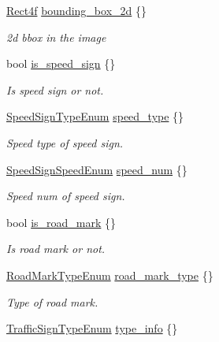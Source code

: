 \begin{DoxyCompactItemize}
\hyperlink{structmaf__perception__interface_1_1Rect4f}{Rect4f} \hyperlink{structmaf__perception__interface_1_1TrafficSign_abde6c105942de8ca3f7e6b130cdc5726}{bounding\+\_\+box\+\_\+2d} \{\}
\begin{DoxyCompactList}\small\item\em 2d bbox in the image \end{DoxyCompactList}\item 
bool \hyperlink{structmaf__perception__interface_1_1TrafficSign_a5db2969b358c4e9bac0cf510952f4c70}{is\+\_\+speed\+\_\+sign} \{\}
\begin{DoxyCompactList}\small\item\em Is speed sign or not. \end{DoxyCompactList}\item 
\hyperlink{structmaf__perception__interface_1_1SpeedSignTypeEnum}{Speed\+Sign\+Type\+Enum} \hyperlink{structmaf__perception__interface_1_1TrafficSign_a238b29fa9796c29dd7257bb6fbad4f3d}{speed\+\_\+type} \{\}
\begin{DoxyCompactList}\small\item\em Speed type of speed sign. \end{DoxyCompactList}\item 
\hyperlink{structmaf__perception__interface_1_1SpeedSignSpeedEnum}{Speed\+Sign\+Speed\+Enum} \hyperlink{structmaf__perception__interface_1_1TrafficSign_a75e468d996231eebfe68f4bae50cf7e7}{speed\+\_\+num} \{\}
\begin{DoxyCompactList}\small\item\em Speed num of speed sign. \end{DoxyCompactList}\item 
bool \hyperlink{structmaf__perception__interface_1_1TrafficSign_a0d3998525dd4c021906a0f0ed63998eb}{is\+\_\+road\+\_\+mark} \{\}
\begin{DoxyCompactList}\small\item\em Is road mark or not. \end{DoxyCompactList}\item 
\hyperlink{structmaf__perception__interface_1_1RoadMarkTypeEnum}{Road\+Mark\+Type\+Enum} \hyperlink{structmaf__perception__interface_1_1TrafficSign_aea4f9f1e5b1592aff7b76325463db754}{road\+\_\+mark\+\_\+type} \{\}
\begin{DoxyCompactList}\small\item\em Type of road mark. \end{DoxyCompactList}\item 
\hyperlink{structmaf__perception__interface_1_1TrafficSignTypeEnum}{Traffic\+Sign\+Type\+Enum} \hyperlink{structmaf__perception__interface_1_1TrafficSign_a40cda4bfde2f1847565a5bc41420a05c}{type\+\_\+info} \{\}

\end{DoxyCompactItemize}
